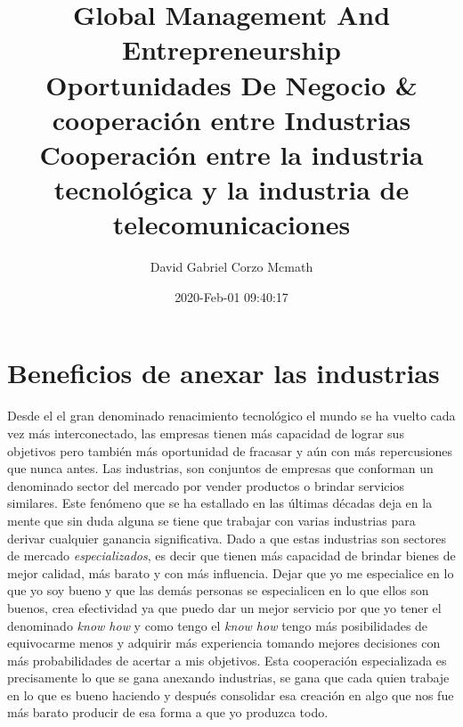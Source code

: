 \documentclass{article}
\title{ Global Management And Entrepreneurship \\ Oportunidades De Negocio \& cooperación entre Industrias \\ 
\Huge Cooperación entre la industria tecnológica y la industria de telecomunicaciones }
\author{David Gabriel Corzo Mcmath}
\date{2020-Feb-01 09:40:17}
\begin{document}
\maketitle

\section{Beneficios de anexar las industrias}
Desde el el gran denominado renacimiento tecnológico el mundo se ha vuelto cada vez más interconectado, las empresas tienen más capacidad de lograr sus objetivos pero también más oportunidad de fracasar y aún con más repercusiones que nunca antes. Las industrias, son conjuntos de empresas que conforman un denominado sector del mercado por vender productos o brindar servicios similares. Este fenómeno que se ha estallado en las últimas décadas deja en la mente que sin duda alguna se tiene que trabajar con varias industrias para derivar cualquier ganancia significativa. Dado a que estas industrias son sectores de mercado \emph{especializados}, es decir que tienen más capacidad de brindar bienes de mejor calidad, más barato y con más influencia. Dejar que yo me especialice en lo que yo soy bueno y que las demás personas se especialicen en lo que ellos son buenos, crea efectividad ya que puedo dar un mejor servicio por que yo tener el denominado \emph{know how} y como tengo el \emph{know how} tengo más posibilidades de equivocarme menos y adquirir más experiencia tomando mejores decisiones con más probabilidades de acertar a mis objetivos. Esta cooperación especializada es precisamente lo que se gana anexando industrias, se gana que cada quien trabaje en lo que es bueno haciendo y después consolidar esa creación en algo que nos fue más barato producir de esa forma a que yo produzca todo.
\end{document}
